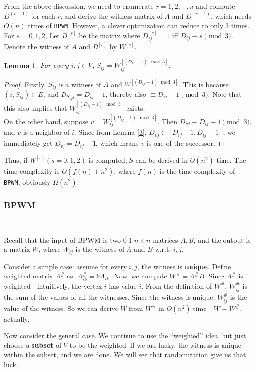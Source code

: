 \documentclass[12pt]{article}
\theoremstyle{plain}
\newtheorem{lemma}{Lemma}[section]
\begin{document}
From the above discussion, we need to enumerate $r=1,2,\cdots,n$ and compute $D^{(r-1)}$ for each $r$, and derive the witness matrix of $A$ and $D^{(r-1)}$, which needs $O(n)$ times of \texttt{BPWM}. However, a clever optimization can reduce to only $3$ times. For $s=0,1,2$, Let $D^{[s]}$ be the matrix where $D^{[s]}_{ij}=1$ iff $D_{ij}\equiv s\pmod 3$. Denote the witness of $A$ and $D^{[s]}$ by $W^{[s]}$.

\begin{lemma}
\label{5}
For every $i,j\in V$, $S_{ij}=W^{[(D_{ij}-1)\mod 3]}_{ij}$.
\end{lemma}
\begin{proof}
Firstly, $S_{ij}$ is a witness of $A$ and $W^{[(D_{ij}-1)\mod 3]}$. This is because $(i,S_{ij})\in E$, and $D_{S_{ij}j}=D_{ij}-1$, thereby also $\equiv D_{ij}-1\pmod 3$. Note that this also implies that $W^{[(D_{ij}-1)\mod 3]}_{ij}$ exists.\\
On the other hand, suppose $v=W^{[(D_{ij}-1)\mod 3]}_{ij}$. Then $D_{vj}\equiv D_{ij}-1\pmod 3$, and $v$ is a neighbor of $i$. Since from Lemma \ref{3}, $D_{vj}\in [D_{ij}-1,D_{ij}+1]$, we immediately get $D_{vj}=D_{ij}-1$, which means $v$ is one of the successor.
\end{proof}

Thus, if $W^{[s]}(s=0,1,2)$ is computed, $S$ can be derived in $O(n^2)$ time. The time complexity is $O(f(n)+n^2)$, where $f(n)$ is the time complexity of \texttt{BPWM}, obviously $\Omega(n^2)$.

\subsubsection{BPWM}
\label{sec:bpwm}\

Recall that the input of BPWM is two 0-1 $n\times n$ matrices $A,B$, and the output is a matrix $W$, where $W_{ij}$ is the witness of $A$ and $B$ w.r.t. $i,j$.

Consider a simple case: assume for every $i,j$, the witness is \textbf{unique}. Define weighted matrix $A^{\#}$ as: $A^{\#}_{ik}=kA_{ik}$. Now, we compute $W^{\#}=A^{\#}B$. Since $A^{\#}$ is weighted - intuitively, the vertex $i$ has value $i$. From the definition of $W^{\#}$, $W^{\#}_{ij}$ is the sum of the values of all the witnesses. Since the witness is unique, $W^{\#}_{ij}$ is the value of the witness. So we can derive $W$ from $W^{\#}$ in $O(n^2)$ time - $W=W^{\#}$, actually.

Now consider the general case. We continue to use the ``weighted'' idea, but just choose a \textbf{subset} of $V$ to be the weighted. If we are lucky, the witness is unique within the subset, and we are done. We will see that randomization give us that luck.
\end{document}
